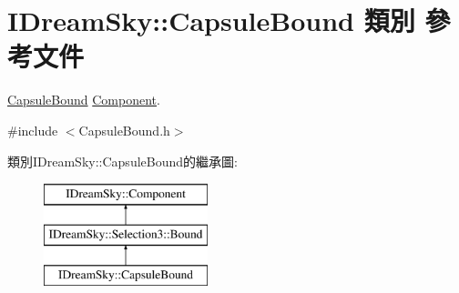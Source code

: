 \hypertarget{class_i_dream_sky_1_1_capsule_bound}{}\section{I\+Dream\+Sky\+:\+:Capsule\+Bound 類別 參考文件}
\label{class_i_dream_sky_1_1_capsule_bound}


\hyperlink{class_i_dream_sky_1_1_capsule_bound}{Capsule\+Bound} \hyperlink{class_i_dream_sky_1_1_component}{Component}.  




{\ttfamily \#include $<$Capsule\+Bound.\+h$>$}

類別\+I\+Dream\+Sky\+:\+:Capsule\+Bound的繼承圖\+:\begin{figure}[H]
\begin{center}
\leavevmode
\includegraphics[height=3.000000cm]{class_i_dream_sky_1_1_capsule_bound}
\end{center}
\end{figure}
